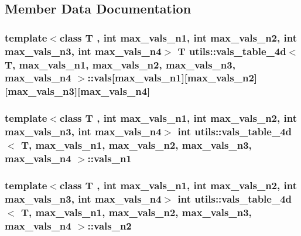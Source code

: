 \subsection{Member Data Documentation}
\hypertarget{structutils_1_1vals__table__4d_a735266a1f587c1c6a065a9a52bcb0502}{
\subsubsection[{vals}]{\setlength{\rightskip}{0pt plus 5cm}template$<$class T , int max\-\_\-vals\-\_\-n1, int max\-\_\-vals\-\_\-n2, int max\-\_\-vals\-\_\-n3, int max\-\_\-vals\-\_\-n4$>$ T {\bf utils\-::vals\-\_\-table\-\_\-4d}$<$ T, max\-\_\-vals\-\_\-n1, max\-\_\-vals\-\_\-n2, max\-\_\-vals\-\_\-n3, max\-\_\-vals\-\_\-n4 $>$\-::vals\mbox{[}max\-\_\-vals\-\_\-n1\mbox{]}\mbox{[}max\-\_\-vals\-\_\-n2\mbox{]}\mbox{[}max\-\_\-vals\-\_\-n3\mbox{]}\mbox{[}max\-\_\-vals\-\_\-n4\mbox{]}}}\label{structutils_1_1vals__table__4d_a735266a1f587c1c6a065a9a52bcb0502}
\hypertarget{structutils_1_1vals__table__4d_afec88fbd769ce98aad5e14d16ab948fc}{
\subsubsection[{vals\-\_\-n1}]{\setlength{\rightskip}{0pt plus 5cm}template$<$class T , int max\-\_\-vals\-\_\-n1, int max\-\_\-vals\-\_\-n2, int max\-\_\-vals\-\_\-n3, int max\-\_\-vals\-\_\-n4$>$ {\bf int} {\bf utils\-::vals\-\_\-table\-\_\-4d}$<$ T, max\-\_\-vals\-\_\-n1, max\-\_\-vals\-\_\-n2, max\-\_\-vals\-\_\-n3, max\-\_\-vals\-\_\-n4 $>$\-::vals\-\_\-n1}}\label{structutils_1_1vals__table__4d_afec88fbd769ce98aad5e14d16ab948fc}
\hypertarget{structutils_1_1vals__table__4d_a485b4f6f987c51d68d9f1010185a7a41}{
\subsubsection[{vals\-\_\-n2}]{\setlength{\rightskip}{0pt plus 5cm}template$<$class T , int max\-\_\-vals\-\_\-n1, int max\-\_\-vals\-\_\-n2, int max\-\_\-vals\-\_\-n3, int max\-\_\-vals\-\_\-n4$>$ {\bf int} {\bf utils\-::vals\-\_\-table\-\_\-4d}$<$ T, max\-\_\-vals\-\_\-n1, max\-\_\-vals\-\_\-n2, max\-\_\-vals\-\_\-n3, max\-\_\-vals\-\_\-n4 $>$\-::vals\-\_\-n2}}\label{structutils_1_1vals__table__4d_a485b4f6f987c51d68d9f1010185a7a41}
